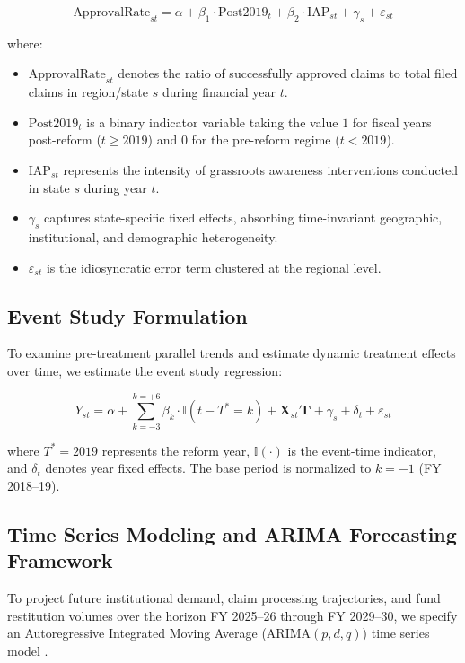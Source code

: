 \documentclass[openany]{book}
\begin{document}
\begin{equation}
\text{ApprovalRate}_{st} = \alpha + \beta_1 \cdot \text{Post2019}_{t} + \beta_2 \cdot \text{IAP}_{st} + \gamma_s + \varepsilon_{st}
\label{eq:did_model}
\end{equation}

where:
\begin{itemize}
    \item $\text{ApprovalRate}_{st}$ denotes the ratio of successfully approved claims to total filed claims in region/state $s$ during financial year $t$.
    \item $\text{Post2019}_{t}$ is a binary indicator variable taking the value $1$ for fiscal years post-reform ($t \ge 2019$) and $0$ for the pre-reform regime ($t < 2019$).
    \item $\text{IAP}_{st}$ represents the intensity of grassroots awareness interventions conducted in state $s$ during year $t$.
    \item $\gamma_s$ captures state-specific fixed effects, absorbing time-invariant geographic, institutional, and demographic heterogeneity.
    \item $\varepsilon_{st}$ is the idiosyncratic error term clustered at the regional level.
\end{itemize}

\subsection{Event Study Formulation}
To examine pre-treatment parallel trends and estimate dynamic treatment effects over time, we estimate the event study regression:

\begin{equation}
Y_{st} = \alpha + \sum_{k = -3}^{k = +6} \beta_k \cdot \mathbb{I}(t - T^* = k) + \mathbf{X}_{st}' \boldsymbol{\Gamma} + \gamma_s + \delta_t + \varepsilon_{st}
\label{eq:event_study}
\end{equation}

where $T^* = 2019$ represents the reform year, $\mathbb{I}(\cdot)$ is the event-time indicator, and $\delta_t$ denotes year fixed effects. The base period is normalized to $k = -1$ (FY 2018--19).

\subsection{Time Series Modeling and ARIMA Forecasting Framework}
To project future institutional demand, claim processing trajectories, and fund restitution volumes over the horizon FY 2025--26 through FY 2029--30, we specify an Autoregressive Integrated Moving Average ($\text{ARIMA}(p, d, q)$) time series model \cite{box2015time, hyndman2018forecasting}. 
\end{document}
